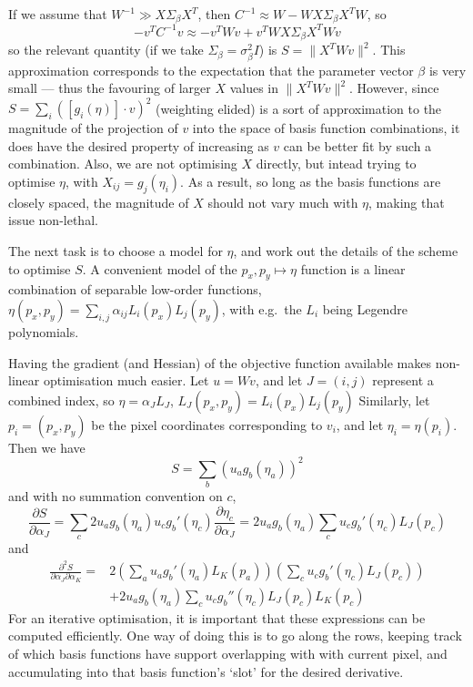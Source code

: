 If we assume that $W^{-1} \gg X \Sigma_\beta X^T$, then
$C^{-1} \approx W - W X \Sigma_\beta X^T W$, so
\[
- v^T C^{-1} v \approx  - v^T W v + v^T W X \Sigma_\beta X^T W v
\]
so the relevant quantity (if we take $\Sigma_\beta = \sigma_\beta^2
I$) is $S = \|X^T W v\|^2$. This approximation corresponds to the
expectation that the parameter vector $\beta$ is very small --- thus
the favouring of larger $X$ values in $\| X^T W v\|^2$. However, since
$S = \sum_i ([g_i(\eta)] \cdot v)^2$ (weighting elided) is a sort of
approximation to the magnitude of the projection of $v$ into the space of basis
function combinations, it does have the desired property of increasing
as $v$ can be better fit by such a combination. Also, we are
not optimising $X$ directly, but intead trying to optimise
$\eta$, with $X_{ij} = g_j (\eta_i)$. As a result, so long as the basis
functions are closely spaced, the magnitude of $X$ should not vary much
with $\eta$, making that issue non-lethal.

The next task is to choose a model for $\eta$, and work out the details
of the scheme to optimise $S$. A convenient model of the $p_x, p_y
\mapsto \eta$ function is a linear combination of separable low-order functions,
$\eta(p_x, p_y) = \sum_{i,j} \alpha_{ij}  L_i(p_x) L_j(p_y)$, with e.g.\
the $L_i$ being Legendre polynomials.

Having the gradient (and Hessian) of the objective function available makes non-linear
optimisation much easier. Let $u = W v$, and let $J = (i,j)$ represent a combined index,
so $\eta = \alpha_J L_J$, $L_J(p_x, p_y) = L_i(p_x)L_j(p_y)$
Similarly, let $p_i = (p_x, p_y)$ be the pixel coordinates corresponding to $v_i$,
and let $\eta_i = \eta(p_i)$. Then we have
\[
S = \sum_b (u_a g_b (\eta_a))^2
\]
and with no summation convention on $c$, 
\[
\frac{\partial S}{\partial \alpha_J} = \sum_c 2 u_a g_b (\eta_a) u_c g_b' (\eta_c) \frac{
\partial \eta_c}{\partial \alpha_J}
= 2 u_a g_b (\eta_a) \sum_c u_c g_b'(\eta_c) L_J(p_c)
\]
and
\begin{align*}
\frac{\partial^2 S}{\partial \alpha_J \partial \alpha_K} = & 2
\left(\sum_a u_a g_b'(\eta_a) L_K (p_a)\right)
\left(\sum_c u_c g_b'(\eta_c) L_J (p_c)\right)
\\
 &+ 2 u_a g_b (\eta_a)
\sum_c u_c g_b''(\eta_c) L_J(p_c) L_K(p_c)
\end{align*}
%
For an iterative optimisation, it is important that these expressions
can be computed efficiently. One way of doing this is to go along the
rows, keeping track of which basis functions have support overlapping
with with current pixel, and accumulating into that basis function's
`slot' for the desired derivative.
